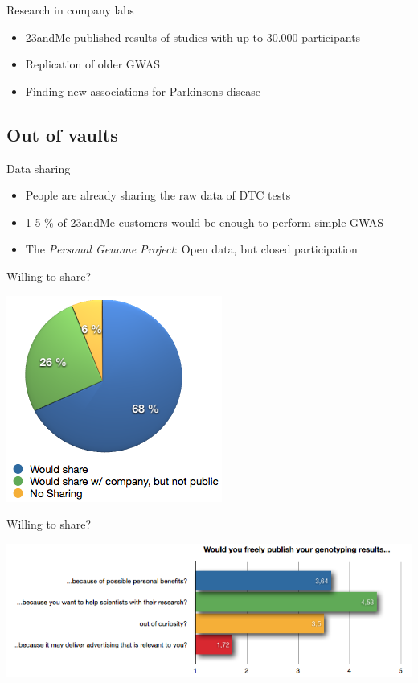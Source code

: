 \documentclass[12pt,a4paper]{beamer}
\begin{document}
\begin{frame}{Research in company labs}
\begin{itemize}
\item 23andMe published results of studies with up to 30.000 participants
\pause \item Replication of older GWAS
\pause \item Finding new associations for Parkinsons disease
\end{itemize}
\end{frame}

\subsection{Out of vaults}

\begin{frame}{Data sharing}
\begin{itemize}
\item People are already sharing the raw data of DTC tests 
\pause \item 1-5 \% of 23andMe customers would be enough to perform simple GWAS
\pause \item The \textit{Personal Genome Project}: Open data, but closed participation 
\end{itemize}
\end{frame}

\begin{frame}{Willing to share?}
\begin{center}
\includegraphics[scale=0.5]{pie-sharing.png}
\end{center}
\end{frame}

\begin{frame}{Willing to share?}
\begin{center}
\includegraphics[scale=0.45]{sharing-reasons.png}
\end{center}
\end{frame}
\end{document}
